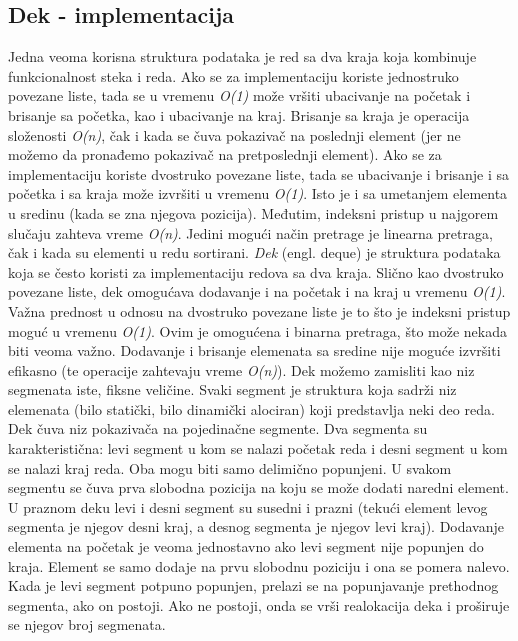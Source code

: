 \documentclass{article}
\begin{document}
\subsection{Dek - implementacija}
Jedna veoma
korisna struktura podataka je red sa dva kraja koja kombinuje funkcionalnost
steka i reda.
Ako se za implementaciju koriste jednostruko povezane liste, tada se u vremenu
\textit{O(1)} može vršiti ubacivanje na početak i brisanje sa početka, kao i ubacivanje
na kraj. Brisanje sa kraja
je operacija složenosti \textit{O(n)}, čak i kada se čuva pokazivač na poslednji element
(jer ne možemo da pronađemo pokazivač na pretposlednji element).
Ako se za implementaciju koriste dvostruko povezane liste, tada se ubacivanje
i brisanje i sa početka i sa kraja može izvršiti u vremenu \textit{O(1)}. Isto je i sa
umetanjem elementa u sredinu (kada se zna njegova pozicija). Međutim, indeksni
pristup u najgorem slučaju zahteva vreme
\textit{O(n)}. 
\newline Jedini mogući način pretrage je linearna pretraga, čak i kada su elementi
u redu sortirani.
\newline \textit{Dek} (engl. deque) je struktura podataka koja se često
koristi za implementaciju redova sa dva kraja. Slično kao dvostruko povezane
liste, dek omogućava dodavanje i na početak i na kraj u vremenu \textit{O(1)}. Važna prednost u odnosu na dvostruko povezane liste je to
što je indeksni pristup moguć u vremenu \textit{O(1)}. Ovim je omogućena i binarna
pretraga, što može nekada biti veoma važno. Dodavanje i brisanje elemenata sa
sredine nije moguće izvršiti efikasno (te operacije zahtevaju vreme \textit{O(n)}).
Dek možemo zamisliti kao niz segmenata iste, fiksne veličine. Svaki segment je
struktura koja sadrži niz elemenata (bilo statički, bilo dinamički alociran) koji
predstavlja neki deo reda. 
\newline Dek čuva niz pokazivača na pojedinačne segmente. Dva segmenta su karakteristična: levi segment u kom se nalazi početak reda i desni segment u kom se
nalazi kraj reda. Oba mogu biti samo delimično popunjeni. U svakom segmentu
se čuva prva slobodna pozicija na koju se može dodati naredni element. U praznom deku levi i desni segment su
susedni i prazni (tekući element levog segmenta je njegov desni kraj, a desnog
segmenta je njegov levi kraj).
Dodavanje elementa na početak je veoma jednostavno ako levi segment nije
popunjen do kraja. Element se samo dodaje na prvu slobodnu poziciju i ona
se pomera nalevo. Kada je levi segment potpuno popunjen, prelazi se na
popunjavanje prethodnog segmenta, ako on postoji. Ako ne postoji, onda se vrši realokacija deka i proširuje se njegov broj segmenata.
\end{document}
